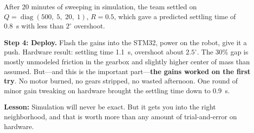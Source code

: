 \begin{mdframed}[linewidth=1pt, innertopmargin=10pt, innerbottommargin=10pt]
After 20 minutes of sweeping in simulation, the team settled on
$Q = \operatorname{diag}(500,\; 5,\; 20,\; 1)$, $R = 0.5$, which gave a
predicted settling time of 0.8~s with less than $2^\circ$ overshoot.

\textbf{Step 4: Deploy.} Flash the gains into the STM32, power on the robot,
give it a push. Hardware result: settling time 1.1~s, overshoot about
$2.5^\circ$. The 30\% gap is mostly unmodeled friction in the gearbox and
slightly higher center of mass than assumed. But---and this is the important
part---\textbf{the gains worked on the first try}. No motor burned, no gears
stripped, no wasted afternoon. One round of minor gain tweaking on hardware
brought the settling time down to 0.9~s.

\textbf{Lesson:} Simulation will never be exact. But it gets you into the
right neighborhood, and that is worth more than any amount of trial-and-error
on hardware.
\end{mdframed}
